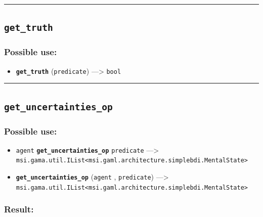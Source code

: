 \documentclass[]{book}
\providecommand{\tightlist}{%
  \setlength{\itemsep}{0pt}\setlength{\parskip}{0pt}}
\theoremstyle{definition}
\theoremstyle{definition}
\theoremstyle{definition}
\theoremstyle{remark}
\begin{document}
\begin{center}\rule{0.5\linewidth}{\linethickness}\end{center}

\subsection{\texorpdfstring{\texttt{get\_truth}}{get\_truth}}\label{get_truth}

\subsubsection{Possible use:}\label{possible-use-231}

\begin{itemize}
\tightlist
\item
  \textbf{\texttt{get\_truth}} (\texttt{predicate}) ---\textgreater{}
  \texttt{bool}
\end{itemize}

\begin{center}\rule{0.5\linewidth}{\linethickness}\end{center}

\subsection{\texorpdfstring{\texttt{get\_uncertainties\_op}}{get\_uncertainties\_op}}\label{get_uncertainties_op}

\subsubsection{Possible use:}\label{possible-use-232}

\begin{itemize}
\tightlist
\item
  \texttt{agent} \textbf{\texttt{get\_uncertainties\_op}}
  \texttt{predicate} ---\textgreater{}
  \texttt{msi.gama.util.IList\textless{}msi.gaml.architecture.simplebdi.MentalState\textgreater{}}
\item
  \textbf{\texttt{get\_uncertainties\_op}} (\texttt{agent} ,
  \texttt{predicate}) ---\textgreater{}
  \texttt{msi.gama.util.IList\textless{}msi.gaml.architecture.simplebdi.MentalState\textgreater{}}
\end{itemize}

\subsubsection{Result:}\label{result-224}
\end{document}
